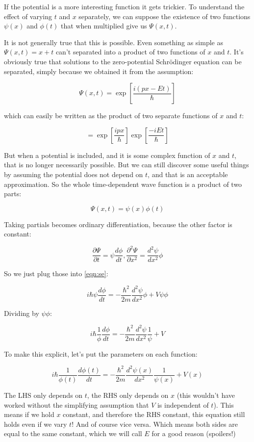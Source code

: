 If the potential is a more interesting function it gets trickier. To understand the effect of varying $t$ and $x$ separately, we can suppose the existence of two functions $\psi(x)$ and $\phi(t)$ that when multiplied give us $\Psi(x, t)$.

It is not generally true that this is possible. Even something as simple as $\Psi(x, t) = x + t$ can't separated into a product of two functions of $x$ and $t$. It's obviously true that solutions to the zero-potential Schrödinger equation can be separated, simply because we obtained it from the assumption:

$$
\Psi(x, t) = \exp \left[ {\frac{i(px - Et)}{\hbar}} \right]
$$

which can easily be written as the product of two separate functions of $x$ and $t$:

$$
= \exp \left[ {\frac{ipx}{\hbar}} \right]
\exp \left[ {\frac{-iEt}{\hbar}} \right]
$$

But when a potential is included, and it is some complex function of $x$ and $t$, that is no longer necessarily possible. But we can still discover some useful things by assuming the potential does not depend on $t$, and that is an acceptable approximation. So the whole time-dependent wave function is a product of two parts:

$$\Psi(x, t) = \psi(x) \phi(t)$$

Taking partials becomes ordinary differentiation, because the other factor is constant:

$$
\frac{\partial \Psi}{\partial t}
= \psi \frac{d \phi}{d t},
\frac{\partial^2 \Psi}{\partial x^2}
= \frac{d^2 \psi}{d x^2}  \phi
$$

So we just plug those into \eqref{eqn:se}:

$$
i\hbar
\psi \frac{d \phi}{d t}
=
- \frac{\hbar^2}{2m}
\frac{d^2 \psi}{d x^2}  \phi
+ V \psi \phi
$$

Dividing by $\psi \phi$:

$$
i\hbar
\frac{1}{\phi}
\frac{d \phi}{d t}
=
- \frac{\hbar^2}{2m}
\frac{d^2 \psi}{d x^2}
\frac{1}{\psi}
+ V
$$

To make this explicit, let's put the parameters on each function:

$$
i\hbar
\frac{1}{\phi(t)}
\frac{d \phi(t)}{d t}
=
- \frac{\hbar^2}{2m}
\frac{d^2 \psi(x)}{d x^2}
\frac{1}{\psi(x)}
+ V(x)
$$

The LHS only depends on $t$, the RHS only depends on $x$ (this wouldn't have worked without the simplifying assumption that $V$ is independent of $t$). This means if we hold $x$ constant, and therefore the RHS constant, this equation still holds even if we vary $t$! And of course vice versa. Which means both sides are equal to the same constant, which we will call $E$ for a good reason (spoilers!)

